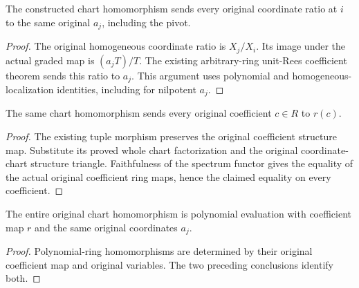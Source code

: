 \begin{theorem}
\label{thm:general-generated-tuple-original-chart-coordinate}
\leanok
The constructed chart homomorphism sends every original coordinate ratio
at $i$ to the same original $a_j$, including the pivot.
\end{theorem}
\begin{proof}
The original homogeneous coordinate ratio is $X_j/X_i$. Its image under
the actual graded map is $(a_jT)/T$. The existing arbitrary-ring unit-Rees
coefficient theorem sends this ratio to $a_j$. This argument uses polynomial
and homogeneous-localization identities, including for nilpotent $a_j$.
\end{proof}

\begin{theorem}
\label{thm:general-generated-tuple-original-chart-coefficients}
\leanok
The same chart homomorphism sends every original coefficient $c\in R$
to $r(c)$.
\end{theorem}
\begin{proof}
The existing tuple morphism preserves the original coefficient structure
map. Substitute its proved whole chart factorization and the original
coordinate-chart structure triangle. Faithfulness of the spectrum functor
gives the equality of the actual original coefficient ring maps, hence the
claimed equality on every coefficient.
\end{proof}

\begin{theorem}
\label{thm:general-generated-tuple-original-chart-evaluation}
\leanok
The entire original chart homomorphism is polynomial evaluation with
coefficient map $r$ and the same original coordinates $a_j$.
\end{theorem}
\begin{proof}
Polynomial-ring homomorphisms are determined by their original coefficient
map and original variables. The two preceding conclusions identify both.
\end{proof}

